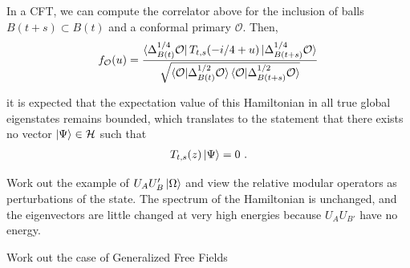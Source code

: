 \documentclass[a4paper,11pt]{article}
\theoremstyle{definition}
\newcommand{\lb}{\left(}
\newcommand{\rb}{\right)}
\newcommand{\mO}{\mathcal{O}}
\begin{document}
In a CFT, we can compute the correlator above for the inclusion of balls $B(t+s)\subset B(t)$ and a conformal primary $\mO$. Then,
\begin{eqnarray}
    f_\mO(u)=\frac{\bra{\Delta_{B(t)}^{1/4}\mO} T_{t,s}(-i/4+u)\ket{\Delta_{B(t+s)}^{1/4} \mO}}{\sqrt{\braket{\mO|\Delta_{B(t)}^{1/2}\mO}\braket{\mO|\Delta_{B(t+s)}^{1/2}\mO}}}
\end{eqnarray}


it is expected that the expectation value of this Hamiltonian in all true global eigenstates remains bounded, which translates to the statement that there exists no vector $\ket{\Psi}\in \mathcal{H}$ such that 
\begin{eqnarray}
    T_{t,s}(z)\ket{\Psi}=0\ .
\end{eqnarray}


Work out the example of $U_A U_B'\ket{\Omega}$ and view the relative modular operators as perturbations of the state. The spectrum of the Hamiltonian is unchanged, and the eigenvectors are little changed at very high energies because $U_AU_{B'}$ have no energy.

Work out the case of Generalized Free Fields
 







\end{document}
